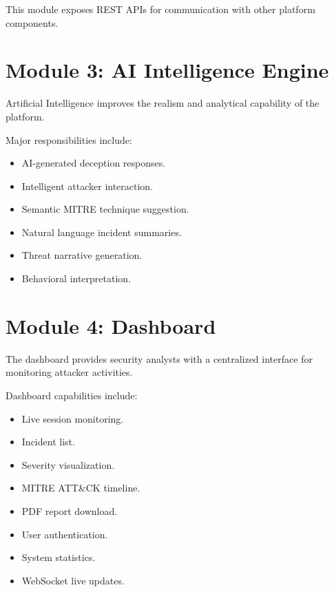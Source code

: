\documentclass[12pt,a4paper]{report}
\begin{document}
This module exposes REST APIs for communication with other platform components.


\section{Module 3: AI Intelligence Engine}

Artificial Intelligence improves the realism and analytical capability of the platform.

Major responsibilities include:

\begin{itemize}
\item AI-generated deception responses.
\item Intelligent attacker interaction.
\item Semantic MITRE technique suggestion.
\item Natural language incident summaries.
\item Threat narrative generation.
\item Behavioral interpretation.
\end{itemize}


\section{Module 4: Dashboard}

The dashboard provides security analysts with a centralized interface for monitoring attacker activities.

Dashboard capabilities include:

\begin{itemize}
\item Live session monitoring.
\item Incident list.
\item Severity visualization.
\item MITRE ATT\&CK timeline.
\item PDF report download.
\item User authentication.
\item System statistics.
\item WebSocket live updates.
\end{itemize}

\end{document}

